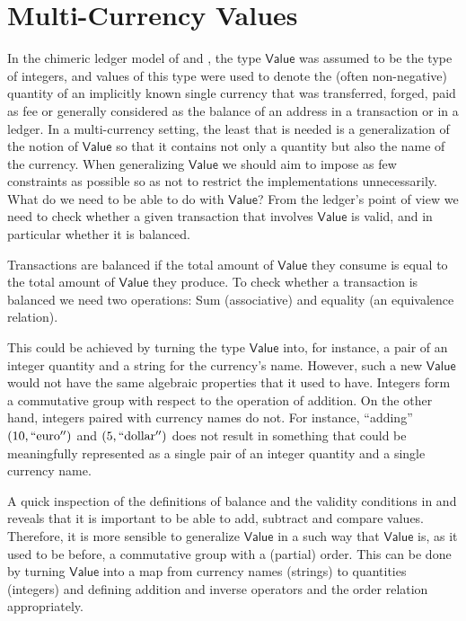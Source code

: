\documentclass{llncs}
\newcommand{\type}[1]{\mathsf{#1}}
\newcommand{\valueT}{\type{Value}}
\begin{document}
\section{Multi-Currency Values}
\label{sec:MultiCurrencyValues}

In the chimeric ledger model of \cite{ChimericLedgers} and \cite{UTxOScripts}, the type $\valueT$ was assumed to be the type of integers, and values of this type were used to denote the (often non-negative) quantity of an implicitly known single currency that was transferred, forged, paid as fee or generally considered as the balance of an address in a transaction or in a ledger. In a multi-currency setting, the least that is needed is a generalization of the notion of $\valueT$ so that it contains not only a quantity but also the name of the currency. When generalizing $\valueT$ we should aim to impose as few constraints as possible so as not to restrict the implementations unnecessarily. What do we need to be able to do with $\valueT$? From the ledger's point of view we need to check whether a given transaction that involves $\valueT$ is valid, and in particular whether it is balanced.

Transactions are balanced if the total amount of $\valueT$ they consume is equal to the total amount of $\valueT$ they produce. To check whether a transaction is balanced we need two operations: Sum (associative) and equality (an equivalence relation).

\begin{figure}
\end{figure}


This could be achieved by turning the type $\valueT$ into, for instance, a pair of an integer quantity and a string for the currency's name. However, such a new $\valueT$ would not have the same algebraic properties that it used to have. Integers form a commutative group with respect to the operation of addition. On the other hand, integers paired with currency names do not. For instance, ``adding'' $(10, \mathrm{``euro''})$ and $(5, \mathrm{``dollar''})$ does not result in something that could be meaningfully represented as a single pair of an integer quantity and a single currency name. 

A quick inspection of the definitions of balance and the validity conditions in \cite{ChimericLedgers} and \cite{UTxOScripts} reveals that it is important to be able to add, subtract and compare values. Therefore, it is more sensible to generalize $\valueT$ in a such way that $\valueT$ is, as it used to be before, a commutative group with a (partial) order. This can be done by turning $\valueT$ into a map from currency names (strings) to quantities (integers) and defining addition and inverse operators and the order relation appropriately.
\end{document}
